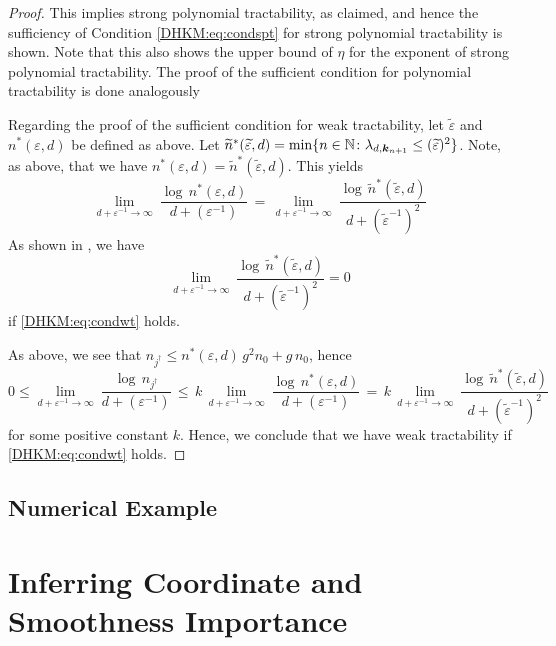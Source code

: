 \documentclass[USenglish]{article}
\theoremstyle{dgthm}
\theoremstyle{dgthm}
\theoremstyle{dgthm}
\theoremstyle{dgthm}
\theoremstyle{dgdef}
\theoremstyle{definition}
\begin{document}
{\begin{proof}
 This implies strong polynomial tractability, as claimed, and hence the sufficiency of Condition \eqref{DHKM:eq:condspt} for 
 strong polynomial tractability is shown. Note that this also shows the upper bound of $\eta$ for the exponent 
 of strong polynomial tractability. The proof of the sufficient condition for polynomial tractability is done analogously
 
 Regarding the proof of the sufficient condition for weak tractability, let $\widetilde{\varepsilon}$ and $n^*(\varepsilon,d)$ be defined as above. Let
 $\widetilde{n}^*(\widetilde{\varepsilon},d)=\min\{n\in{\mathbb{N}}\colon \lambda_{d,{\boldsymbol{k}}_{n+1}}\leq (\widetilde{\varepsilon})^2 \}$. 
 Note, as above, that we have $n^*(\varepsilon,d)=\widetilde{n}^*(\widetilde{\varepsilon},d)$. This yields
 $$   
\lim_{d+\varepsilon^{-1}\to\infty}\   
\frac{\log\, n^*(\varepsilon,d)}   
{d +(\varepsilon^{-1}) }\,=\, \lim_{d+\varepsilon^{-1}\to\infty}\   
\frac{\log\, \widetilde{n}^*(\widetilde{\varepsilon},d)}   
{d +(\widetilde{\varepsilon}^{-1})^{2}}  
$$ 
As shown in \cite{WerWoz17}, we have 
\[
 \lim_{d+\varepsilon^{-1}\to\infty}\   
\frac{\log\, \widetilde{n}^*(\widetilde{\varepsilon},d)}   
{d +(\widetilde{\varepsilon}^{-1})^{2}}=0
\]
if \eqref{DHKM:eq:condwt} holds. 

As above, we see that $n_{j^\dagger}\le n^*(\varepsilon,d)\, g^2 n_0+g\,n_0$, hence 
$$ 
  0\le\lim_{d+\varepsilon^{-1}\to\infty}\   
 \frac{\log\, n_{j^\dagger}}   
{d +(\varepsilon^{-1}) }
 \, \le\, k\,
\lim_{d+\varepsilon^{-1}\to\infty}\   
\frac{\log\, n^*(\varepsilon,d)}   
{d+(\varepsilon^{-1})}\,=\, k\,\lim_{d+\varepsilon^{-1}\to\infty}\   
\frac{\log\, \widetilde{n}^*(\widetilde{\varepsilon},d)}   
{d +(\widetilde{\varepsilon}^{-1})^{2}}  
$$
for some positive constant $k$.
Hence, we conclude that we have weak tractability if \eqref{DHKM:eq:condwt} holds. 
\end{proof}
}


\subsection{Numerical Example}

\fi

\section{Inferring Coordinate and Smoothness Importance} 
\end{document}
